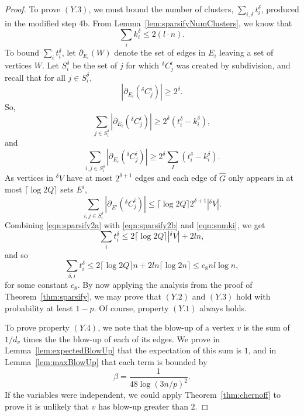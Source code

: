 \documentclass[11pt]{article}
\def\Ghat{\widehat{G}}
\def\bdry#1#2{\partial_{#1}\left(#2\right)}
\def\sizeof#1{\left|#1  \right|}
\newcommand{\ceiling}[1]{\lceil#1\rceil}
\def\preDelta#1{{}^{\delta}\!{#1}}
\begin{document}
\begin{proof}
To prove $(Y.3)$, we must bound the number of clusters,
  $\sum_{i,\delta }t_{i}^{\delta }$, produced
  in the modified step 4b.
From Lemma~\ref{lem:sparsifyNumClusters}, we know that
\begin{equation}\label{eqn:sumki}
  \sum_{i} k^{\delta}_{i} \leq 2 (l \cdot  n).
\end{equation}
To bound $\sum_{i} t^{\delta}_{i}$, let $\bdry{E_{i}}{W}$ denote the set
  of edges in $E_{i}$ leaving a set of vertices $W$.
Let $S^{\delta}_{i}$ be the set of $j$ for which $\preDelta{C}^{i}_{j}$
  was created by subdivision,
and recall that for all
  $j \in S^{\delta}_{i}$,
\[
  \sizeof{\bdry{E_{i}}{\preDelta{C}^{i}_{j}}} \geq 2^{\delta}.
\]
So,
\[
  \sum_{j \in S^{\delta}_{i}}
    \sizeof{\bdry{E_{i}}{\preDelta{C}^{i}_{j}}}
   \geq 2^{\delta} (t^{\delta}_{i} - k^{\delta}_{i}),
\]
and
\begin{equation}\label{eqn:sparsify2a}
  \sum_{i, j \in S^{\delta}_{i}}
    \sizeof{\bdry{E_{i}}{\preDelta{C}^{i}_{j}}}
   \geq 2^{\delta} \sum_{I} (t^{\delta}_{i} - k^{\delta}_{i}).
\end{equation}
As vertices in $\preDelta{V}$ have at most $2^{\delta +1}$ edges
  and
  each edge of $\Ghat$ only appears in at most $\ceiling{\log 2 Q}$ sets $E^{i}$,
\begin{equation}\label{eqn:sparsify2b}
 \sum_{i,j \in S^{\delta}_{i}} \sizeof{\bdry{E^{i}}{\preDelta{C}^{i}_{j}}}
 \leq
 \ceiling{\log 2 Q}  2^{\delta + 1}  \sizeof{\preDelta{V}}.
\end{equation}
Combining \eqref{eqn:sparsify2a} with \eqref{eqn:sparsify2b}
  and \eqref{eqn:sumki}, we get
\[
 \sum_{i} t^{\delta}_{i}
\leq
  2 \ceiling{\log 2 Q} \sizeof{\preDelta{V}} + 2 l n,
\]
and so
\[
 \sum_{\delta , i} t^{\delta}_{i}
\leq
  2 \ceiling{\log 2 Q} n + 2 l n \ceiling{\log 2 n}
 \leq c_{8} n l\log n,
\]
for some constant $c_{8}$.
By now applying the analysis from the proof of Theorem~\ref{thm:sparsify},
  we may prove that $(Y.2)$ and $(Y.3)$ hold with probability
  at least $1-p$.
Of course, property $(Y.1)$ always holds.

To prove property $(Y.4)$,
  we note that the blow-up of a vertex $v$ is the sum
  of $1/d_{v}$ times the the blow-up of each of its edges.
We prove in Lemma~\ref{lem:expectedBlowUp} that the expectation of this
  sum is $1$, and in Lemma~\ref{lem:maxBlowUp} that each
  term is bounded by
\[
  \beta = \frac{1}{48 \log (3 n / p)^{2}}.
\]
If the variables were independent, we could apply Theorem~\ref{thm:chernoff}
  to prove it is unlikely that
  $v$ has blow-up greater than $2$.


\end{proof}
\end{document}
